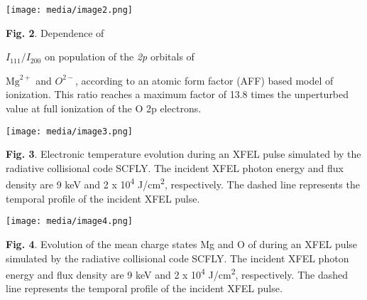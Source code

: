 \texttt{[image: media/image2.png]}

\textbf{Fig. 2}. Dependence of
\(I_{111}/I_{200}\)
on population of the \emph{2p} orbitals of
\(\text{Mg}^{2 +}\)
and \(O^{2 -}\), according to an atomic form factor (AFF) based model of
ionization. This ratio reaches a maximum factor of 13.8 times the
unperturbed value at full ionization of the O 2p electrons.

\texttt{[image: media/image3.png]}

\textbf{Fig. 3}. Electronic temperature evolution during an XFEL pulse
simulated by the radiative collisional code SCFLY. The incident XFEL
photon energy and flux density are 9 keV and 2 x 10\textsuperscript{4}
J/cm\textsuperscript{2}, respectively. The dashed line represents the
temporal profile of the incident XFEL pulse.

\texttt{[image: media/image4.png]}

\textbf{Fig. 4}. Evolution of the mean charge states Mg and O of during
an XFEL pulse simulated by the radiative collisional code SCFLY. The
incident XFEL photon energy and flux density are 9 keV and 2 x
10\textsuperscript{4} J/cm\textsuperscript{2}, respectively. The dashed
line represents the temporal profile of the incident XFEL pulse.

